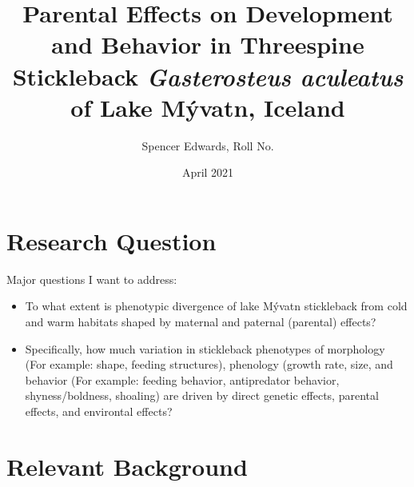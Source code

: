\documentclass[12pt]{extarticle}
\title{Parental Effects on Development and Behavior in Threespine Stickleback \textit{Gasterosteus aculeatus} of Lake M\'yvatn, Iceland}
\author{Spencer Edwards, Roll No.}
\date{April 2021}
\begin{document}
\maketitle

\section*{Research Question}
Major questions I want to address:
\begin{itemize}
 \item To what extent is phenotypic divergence of lake M\'yvatn stickleback from cold and warm habitats
shaped by maternal and paternal (parental) effects?
 \item Specifically, how much variation in stickleback phenotypes of morphology (For example:  shape, feeding structures), phenology (growth rate, size,  and behavior (For example: feeding behavior, antipredator behavior, shyness/boldness, shoaling) are driven by direct genetic effects, parental effects, and environtal effects?
\end{itemize}

\section*{Relevant Background}
\end{document}
